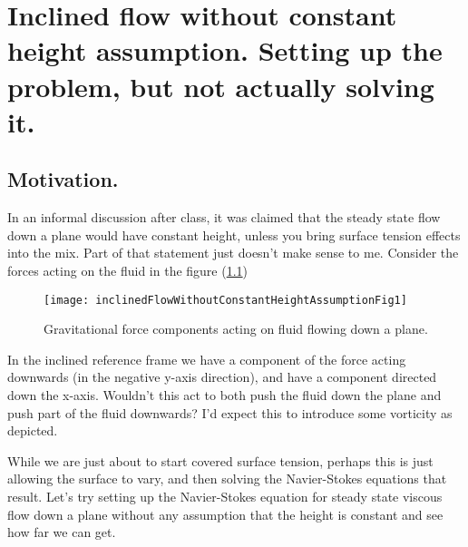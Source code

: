 
%

\chapter{Inclined flow without constant height assumption.  Setting up the problem, but not actually solving it.}
\label{chap:inclinedFlowWithoutConstantHeightAssumption}
{}
\date{Mar 6, 2012}

\beginArtWithToc

\section{Motivation.}

In an informal discussion after class, it was claimed that the steady state flow down a plane would have constant height, unless you bring surface tension effects into the mix.  Part of that statement just doesn't make sense to me.  Consider the forces acting on the fluid in the figure (\ref{fig:inclinedFlowWithoutConstantHeightAssumption:inclinedFlowWithoutConstantHeightAssumptionFig1})

\begin{figure}[htp]
   \centering
   \texttt{[image: inclinedFlowWithoutConstantHeightAssumptionFig1]}
\caption{Gravitational force components acting on fluid flowing down a plane.}
\label{fig:inclinedFlowWithoutConstantHeightAssumption:inclinedFlowWithoutConstantHeightAssumptionFig1}
\end{figure}

In the inclined reference frame we have a component of the force acting downwards (in the negative y-axis direction), and have a component directed down the x-axis.  Wouldn't this act to both push the fluid down the plane and push part of the fluid downwards?  I'd expect this to introduce some vorticity as depicted.

While we are just about to start covered surface tension, perhaps this is just allowing the surface to vary, and then solving the Navier-Stokes equations that result.  Let's try setting up the Navier-Stokes equation for steady state viscous flow down a plane without any assumption that the height is constant and see how far we can get.

